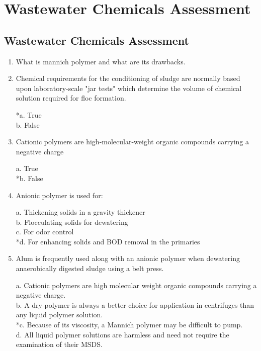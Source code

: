 
\chapter{Wastewater Chemicals Assessment}

\section*{Wastewater Chemicals Assessment}


\begin{enumerate}
\item What is mannich polymer and what are its drawbacks.  

\item  Chemical requirements for the conditioning of sludge are normally based upon laboratory-scale "jar tests" which determine the volume of chemical solution required for floc formation. 

*a. True \\
b. False 

\item  Cationic polymers are high-molecular-weight organic compounds carrying a negative charge

a. True \\
*b. False

\item Anionic polymer is used for:

a. Thickening solids in a gravity thickener \\
b. Flocculating solids for dewatering \\
c. For odor control \\
*d. For enhancing solids and BOD removal in the primaries 


\item Alum is frequently used along with an anionic polymer when dewatering anaerobically digested sludge using a belt press. 

a. Cationic polymers are high molecular weight organic compounds carrying a negative charge. \\
b. A dry polymer is always a better choice for application in centrifuges than any liquid polymer solution. \\
*c. Because of its viscosity, a Mannich polymer may be difficult to pump. \\
d. All liquid polymer solutions are harmless and need not require the examination of their MSDS. 


\end{enumerate}
